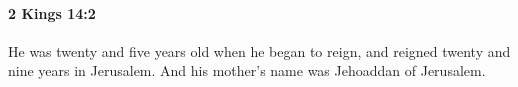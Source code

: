 
		\paragraph{2 Kings 14:2} %
			\label{2KINGS-14-2}

			He was twenty and five years old when he began to reign, and reigned twenty and nine years in Jerusalem. And his mother’s name was Jehoaddan of Jerusalem.


